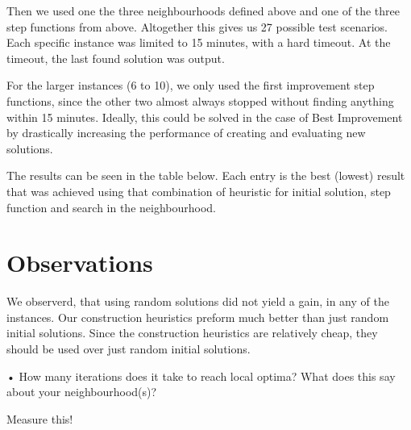 \documentclass [11pt]{article}
\begin{document}
Then we used one the three neighbourhoods defined above and one of the three step functions from above. Altogether this gives us 27 possible test scenarios.  Each specific instance was limited to 15 minutes, with a hard timeout. At the timeout, the last found solution was output. 

For the larger instances (6 to 10), we only used the first improvement step functions, since the other two almost always stopped without finding anything within 15 minutes. Ideally, this could be solved in the case of Best Improvement by drastically increasing the performance of creating and evaluating new solutions. 

The results can be seen in the table below. Each entry is the best (lowest) result that was achieved using that combination of heuristic for initial solution, step function and search in the neighbourhood. 

\section{Observations}
We observerd, that using random solutions did not yield a gain, in any of the instances. Our construction heuristics preform much better than just random initial solutions. Since the construction heuristics are relatively cheap, they should be used over just random initial solutions.


• How many iterations does it take to reach local optima? What does this
say about your neighbourhood(s)?

Measure this!
\end{document}
